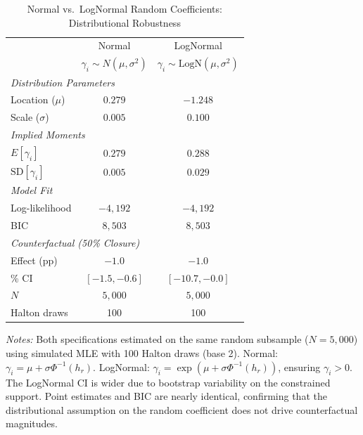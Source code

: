 \documentclass[12pt]{article}
\begin{document}
\begin{table}[H]
\centering
\caption{Normal vs.\ LogNormal Random Coefficients: Distributional Robustness}
\label{tab:mixed_logit_comparison}
\begin{threeparttable}
\begin{tabular}{lcc}
\toprule
 & Normal & LogNormal \\
 & $\gamma_i \sim N(\mu, \sigma^2)$ & $\gamma_i \sim \text{LogN}(\mu, \sigma^2)$ \\
\midrule
\multicolumn{3}{l}{\textit{Distribution Parameters}} \\
\quad Location ($\mu$) & $0.279$ & $-1.248$ \\
\quad Scale ($\sigma$) & $0.005$ & $0.100$ \\
[4pt]
\multicolumn{3}{l}{\textit{Implied Moments}} \\
\quad $E[\gamma_i]$ & $0.279$ & $0.288$ \\
\quad $\text{SD}[\gamma_i]$ & $0.005$ & $0.029$ \\
[4pt]
\multicolumn{3}{l}{\textit{Model Fit}} \\
\quad Log-likelihood & $-4{,}192$ & $-4{,}192$ \\
\quad BIC & $8{,}503$ & $8{,}503$ \\
[4pt]
\multicolumn{3}{l}{\textit{Counterfactual (50\% Closure)}} \\
\quad Effect (pp) & $-1.0$ & $-1.0$ \\
\quad 95\% CI & $[-1.5, -0.6]$ & $[-10.7, -0.0]$ \\
\midrule
$N$ & $5{,}000$ & $5{,}000$ \\
Halton draws & 100 & 100 \\
\bottomrule
\end{tabular}
\begin{tablenotes}
\small
\item \textit{Notes:} Both specifications estimated on the same random subsample ($N = 5{,}000$) using simulated MLE with 100 Halton draws (base 2). Normal: $\gamma_i = \mu + \sigma \Phi^{-1}(h_r)$. LogNormal: $\gamma_i = \exp(\mu + \sigma \Phi^{-1}(h_r))$, ensuring $\gamma_i > 0$. The LogNormal CI is wider due to bootstrap variability on the constrained support. Point estimates and BIC are nearly identical, confirming that the distributional assumption on the random coefficient does not drive counterfactual magnitudes.
\end{tablenotes}
\end{threeparttable}
\end{table}
\end{document}
